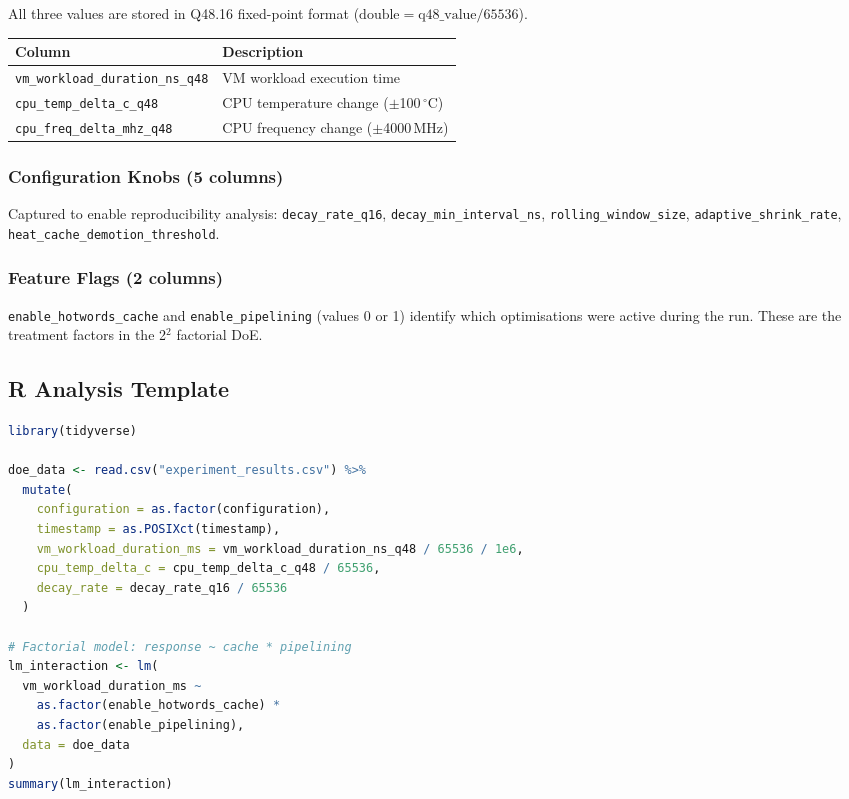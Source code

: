 All three values are stored in Q48.16 fixed-point format
($\text{double} = \text{q48\_value} / 65536$).

\begin{center}
\begin{tabular}{ll}
\toprule
Column & Description \\
\midrule
\texttt{vm\_workload\_duration\_ns\_q48} & VM workload execution time \\
\texttt{cpu\_temp\_delta\_c\_q48}        & CPU temperature change ($\pm$100\,$^{\circ}$C) \\
\texttt{cpu\_freq\_delta\_mhz\_q48}      & CPU frequency change ($\pm$4000\,MHz) \\
\bottomrule
\end{tabular}
\end{center}

\subsubsection{Configuration Knobs (5 columns)}

Captured to enable reproducibility analysis: \texttt{decay\_rate\_q16},
\texttt{decay\_min\_interval\_ns}, \texttt{rolling\_window\_size},
\texttt{adaptive\_shrink\_rate}, \texttt{heat\_cache\_demotion\_threshold}.

\subsubsection{Feature Flags (2 columns)}

\texttt{enable\_hotwords\_cache} and \texttt{enable\_pipelining} (values
0 or 1) identify which optimisations were active during the run. These are
the treatment factors in the 2$^2$ factorial DoE.

\subsection{R Analysis Template}

\begin{lstlisting}[language=R]
library(tidyverse)

doe_data <- read.csv("experiment_results.csv") %>%
  mutate(
    configuration = as.factor(configuration),
    timestamp = as.POSIXct(timestamp),
    vm_workload_duration_ms = vm_workload_duration_ns_q48 / 65536 / 1e6,
    cpu_temp_delta_c = cpu_temp_delta_c_q48 / 65536,
    decay_rate = decay_rate_q16 / 65536
  )

# Factorial model: response ~ cache * pipelining
lm_interaction <- lm(
  vm_workload_duration_ms ~
    as.factor(enable_hotwords_cache) *
    as.factor(enable_pipelining),
  data = doe_data
)
summary(lm_interaction)
\end{lstlisting}

